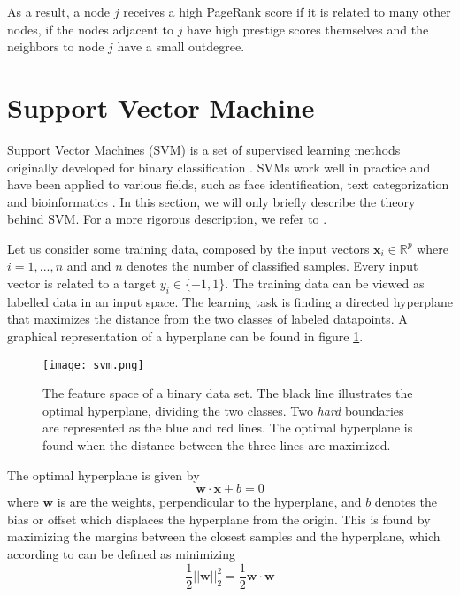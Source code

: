 As a result, a node $j$ receives a high PageRank score if it is related to many other nodes, if the nodes adjacent to $j$ have high prestige scores themselves and the neighbors to node $j$ have a small outdegree. 


\section{Support Vector Machine \label{svmTheory}}
Support Vector Machines (SVM) is a set of supervised learning methods originally developed for binary classification \citep{Hsu2002}. SVMs work well in practice and have been applied to various fields, such as face identification, text categorization and bioinformatics \citep{campbell2011}. In this section, we will only briefly describe the theory behind SVM. For a more rigorous description, we refer to \citep{Kecman2005,Cortes1995,campbell2011}.

Let us consider some training data, composed by the input vectors $\bm{x}_i\in \mathds{R}^p$ where $i=1,...,n$ and and $n$ denotes the number of classified samples. Every input vector is related to a target $y_i \in \{-1,1\}$. The training data can be viewed as labelled data in an input space. The learning task is finding a directed hyperplane that maximizes the distance from the two classes of labeled datapoints. A graphical representation of a hyperplane can be found in figure \ref{svm}. 

\begin{figure}[h!]
    \centering
    \texttt{[image: svm.png]}
    \caption{The feature space of a binary data set. The black line illustrates the optimal hyperplane, dividing the two classes. Two \textit{hard} boundaries are represented as the blue and red lines. The optimal hyperplane is found when the distance between the three lines are maximized.}
    \label{svm}
\end{figure}

The optimal hyperplane is given by \citep{campbell2011}
\begin{equation}
    \bm{w}\cdot\bm{x}+b=0
\end{equation}
where $\bm{w}$ is are the weights, perpendicular to the hyperplane, and $b$ denotes the bias or offset which displaces the hyperplane from the origin. This is found by maximizing the margins between the closest samples and the hyperplane, which according to \citet{campbell2011} can be defined as minimizing $$\frac{1}{2}||\bm{w}||_2^2=\frac{1}{2}\bm{w}\cdot\bm{w}$$

